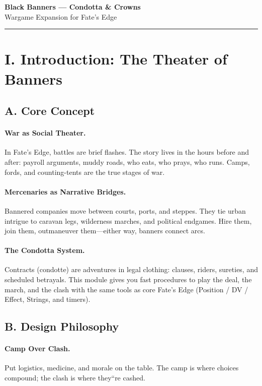 \documentclass[11pt]{article}
\begin{document}


\begin{center}
{\LARGE\bfseries Black Banners --- Condotta \& Crowns}\\[0.5em]
{\large Wargame Expansion for Fate's Edge}\\[1em]
\rule{\textwidth}{0.4pt}
\end{center}

\section*{I. Introduction: The Theater of Banners}

\subsection*{A. Core Concept}

\paragraph{War as Social Theater.} In Fate's Edge, battles are brief flashes. The story lives in the hours before and after: payroll arguments, muddy roads, who eats, who prays, who runs. Camps, fords, and counting-tents are the true stages of war.

\paragraph{Mercenaries as Narrative Bridges.} Bannered companies move between courts, ports, and steppes. They tie urban intrigue to caravan legs, wilderness marches, and political endgames. Hire them, join them, outmaneuver them---either way, banners connect arcs.

\paragraph{The Condotta System.} Contracts (condotte) are adventures in legal clothing: clauses, riders, sureties, and scheduled betrayals. This module gives you fast procedures to play the deal, the march, and the clash with the same tools as core Fate's Edge (Position / DV / Effect, Strings, and timers).

\subsection*{B. Design Philosophy}

\paragraph{Camp Over Clash.} Put logistics, medicine, and morale on the table. The camp is where choices compound; the clash is where they``re cashed.
\end{document}
